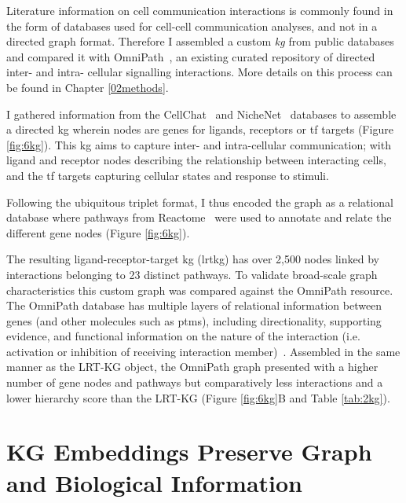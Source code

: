 Literature information on cell communication interactions is commonly found in the form of databases used for cell-cell communication analyses, and not in a directed graph format. Therefore I assembled a custom \emph{kg} from public databases and compared it with OmniPath~\cite{turei_integrated_2021}, an existing curated repository of directed inter- and intra- cellular signalling interactions. More details on this process can be found in Chapter \ref{02methods}.

I gathered information from the CellChat~\cite{jin_inference_2021} and NicheNet~\cite{browaeys_nichenet_2020} databases to assemble a directed \acrshort{kg} wherein nodes are genes for ligands, receptors or \acrfull{tf} targets (Figure \ref{fig:6kg}). This \acrshort{kg} aims to capture inter- and intra-cellular communication; with ligand and receptor nodes describing the relationship between interacting cells, and the \acrshort{tf} targets capturing cellular states and response to stimuli.

Following the ubiquitous triplet format, I thus encoded the graph as a relational database where pathways from Reactome~\cite{gillespie_reactome_2022} were used to annotate and relate the different gene nodes (Figure \ref{fig:6kg}).

The resulting ligand-receptor-target \acrshort{kg} (\acrshort{lrtkg}) has over 2,500 nodes linked by interactions belonging to 23 distinct pathways. To validate broad-scale graph characteristics this custom graph was compared against the OmniPath resource.
The OmniPath database has multiple layers of relational information between genes (and other molecules such as \acrshort{ptm}s), including directionality, supporting evidence, and functional information on the nature of the interaction (i.e. activation or inhibition of receiving interaction member)~\cite{turei_integrated_2021}. Assembled in the same manner as the LRT-KG object, the OmniPath graph presented with a higher number of gene nodes and pathways but comparatively less interactions  and a lower hierarchy score than the LRT-KG (Figure \ref{fig:6kg}B and Table \ref{tab:2kg}).


\section{KG Embeddings Preserve Graph and Biological Information}

